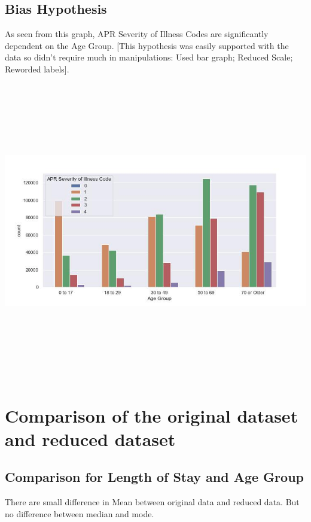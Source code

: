 \documentclass[
	letterpaper, %
]{jdf}
\begin{document}
\subsection{Bias Hypothesis}
As seen from this graph,  APR Severity of Illness Codes are significantly dependent on the Age Group. [This hypothesis was easily supported with the data so didn’t require much in manipulations: Used bar graph; Reduced Scale; Reworded labels].
\begin{jdffigure}
\includegraphics[height=13cm]{Figures/code-age.jpg} \\
\label{fig:code-age-fair}%
\end{jdffigure}

\section{Comparison of the original dataset and reduced dataset}
\subsection{Comparison for Length of Stay and Age Group}
There are small difference in Mean between original data and reduced data. But no difference between median and mode. 
\end{document}
